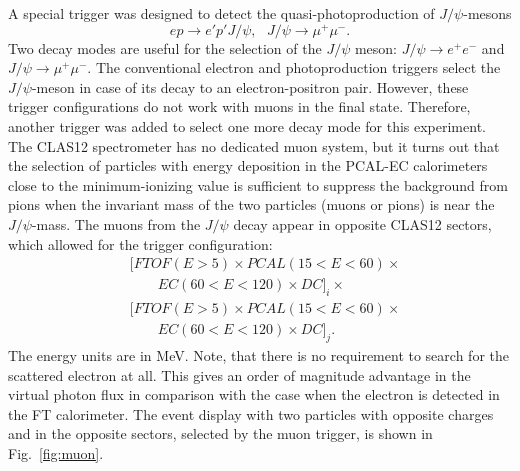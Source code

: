 A special trigger was designed to detect the quasi-photoproduction of $J/\psi$-mesons
$$
ep \to e' p' J/\psi, ~~~J/\psi \to \mu^+\mu^-.
$$
Two decay modes are useful for the selection of the $J/\psi$ meson: $J/\psi \to e^+e^-$ and
$J/\psi \to \mu^+\mu^-$. The conventional electron and photoproduction triggers  select the $J/\psi$-meson
in case of its decay to an electron-positron pair. However, these trigger configurations do not work with
muons in the final state. Therefore, another trigger was added to select one more decay mode for this
experiment. The CLAS12 spectrometer has no dedicated muon system, but it turns out that the selection of
particles with energy deposition in the PCAL-EC calorimeters close to the minimum-ionizing  value is sufficient
to suppress the background from pions when the invariant mass of the two particles (muons or pions) is near the
$J/\psi$-mass. The muons from the $J/\psi$ decay appear in opposite CLAS12 sectors, which allowed for the
trigger configuration:  
\begin{align*} 
 & [FTOF(E{{>}}5){\times}  PCAL(15{<}E{<}60){\times} \\
 & {\qquad} EC(60{<}E{<}120){\times}   DC]_i {\times} \\
 & [FTOF(E{{>}}5){\times}  PCAL(15{<}E{<}60){\times} \\
 & {\qquad} EC(60{<}E{<}120){\times}   DC]_j  .
\end{align*}
\noindent
The energy units are in MeV. Note, that there is no requirement to search for the scattered electron at all. This
gives an order of magnitude advantage in the  virtual photon flux in comparison with the case when the electron
is detected in the FT calorimeter. The event display with two particles with opposite charges and in the opposite
sectors, selected by the muon trigger, is shown in Fig.~\ref{fig:muon}.

